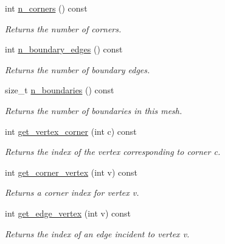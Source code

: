 \begin{DoxyCompactItemize}
\mbox{\label{classgeoproc_1_1TriangleMesh_a6b8c186ba032170de9d4f36b4c1d298b}} 
int \hyperlink{classgeoproc_1_1TriangleMesh_a6b8c186ba032170de9d4f36b4c1d298b}{n\+\_\+corners} () const
\begin{DoxyCompactList}\small\item\em Returns the number of corners. \end{DoxyCompactList}\item 
\mbox{\label{classgeoproc_1_1TriangleMesh_a9986b64e0bb60968c95bdc9c3614959c}} 
int \hyperlink{classgeoproc_1_1TriangleMesh_a9986b64e0bb60968c95bdc9c3614959c}{n\+\_\+boundary\+\_\+edges} () const
\begin{DoxyCompactList}\small\item\em Returns the number of boundary edges. \end{DoxyCompactList}\item 
\mbox{\label{classgeoproc_1_1TriangleMesh_a41a3d6325dcbd8891cd8cad06561b1b4}} 
size\+\_\+t \hyperlink{classgeoproc_1_1TriangleMesh_a41a3d6325dcbd8891cd8cad06561b1b4}{n\+\_\+boundaries} () const
\begin{DoxyCompactList}\small\item\em Returns the number of boundaries in this mesh. \end{DoxyCompactList}\item 
int \hyperlink{classgeoproc_1_1TriangleMesh_aba03ea01f69c0888e0aae17ec330d31d}{get\+\_\+vertex\+\_\+corner} (int c) const
\begin{DoxyCompactList}\small\item\em Returns the index of the vertex corresponding to corner {\itshape c}. \end{DoxyCompactList}\item 
int \hyperlink{classgeoproc_1_1TriangleMesh_a1a9e75bf79d26456527f943c653f31ab}{get\+\_\+corner\+\_\+vertex} (int v) const
\begin{DoxyCompactList}\small\item\em Returns a corner index for vertex {\itshape v}. \end{DoxyCompactList}\item 
int \hyperlink{classgeoproc_1_1TriangleMesh_acc3b8ff563eef67b3f55606a716d5dd9}{get\+\_\+edge\+\_\+vertex} (int v) const
\begin{DoxyCompactList}\small\item\em Returns the index of an edge incident to vertex {\itshape v}. \end{DoxyCompactList}\item 

\end{DoxyCompactItemize}
